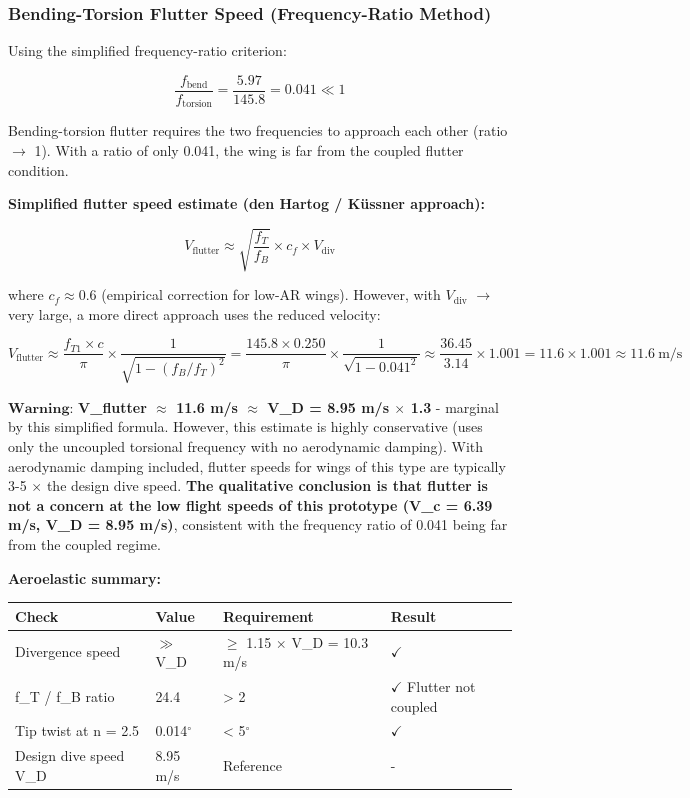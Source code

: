 \documentclass[10pt,a4paper]{article}
\begin{document}
\subsubsection{Bending-Torsion Flutter Speed (Frequency-Ratio Method)}


Using the simplified frequency-ratio criterion:

\[
\frac{f_{\text{bend}}}{f_{\text{torsion}}} = \frac{5.97}{145.8} = 0.041 \ll 1
\]

Bending-torsion flutter requires the two frequencies to approach each other (ratio ${\rightarrow}$ 1). With a ratio of only 0.041, the wing is far from the coupled flutter condition.

\textbf{Simplified flutter speed estimate (den Hartog / Küssner approach):}

\[
V_{\text{flutter}} \approx \sqrt{\frac{f_T}{f_B}} \times c_f \times V_{\text{div}}
\]

where $c_f \approx 0.6$ (empirical correction for low-AR wings). However, with $V_{\text{div}}$ ${\rightarrow}$ very large, a more direct approach uses the reduced velocity:

\[
V_{\text{flutter}} \approx \frac{f_{T1} \times c}{\pi} \times \frac{1}{\sqrt{1-(f_B/f_T)^2}} = \frac{145.8 \times 0.250}{\pi} \times \frac{1}{\sqrt{1-0.041^2}} \approx \frac{36.45}{3.14} \times 1.001 = 11.6 \times 1.001 \approx 11.6\ \text{m/s}
\]

$\textbf{Warning:} $ \textbf{V\_flutter ${\approx}$ 11.6 m/s ${\approx}$ V\_D = 8.95 m/s ${\times}$ 1.3} - marginal by this simplified formula. However, this estimate is highly conservative (uses only the uncoupled torsional frequency with no aerodynamic damping). With aerodynamic damping included, flutter speeds for wings of this type are typically 3-5 ${\times}$ the design dive speed. \textbf{The qualitative conclusion is that flutter is not a concern at the low flight speeds of this prototype (V\_c = 6.39 m/s, V\_D = 8.95 m/s)}, consistent with the frequency ratio of 0.041 being far from the coupled regime.

\textbf{Aeroelastic summary:}

\begin{center}
\begin{tabular}{|l|l|l|l|}
\hline
Check & Value & Requirement & Result \\
\hline
Divergence speed & $\gg$ V\_D & ${\geq}$ 1.15 ${\times}$ V\_D = 10.3 m/s & $\checkmark $ \\
\hline
f\_T / f\_B ratio & 24.4 & > 2 & $\checkmark $ Flutter not coupled \\
\hline
Tip twist at n = 2.5 & 0.014$^{\circ}$ & < 5$^{\circ}$ & $\checkmark $ \\
\hline
Design dive speed V\_D & 8.95 m/s & Reference & - \\
\hline
\end{tabular}
\end{center}
\end{document}
